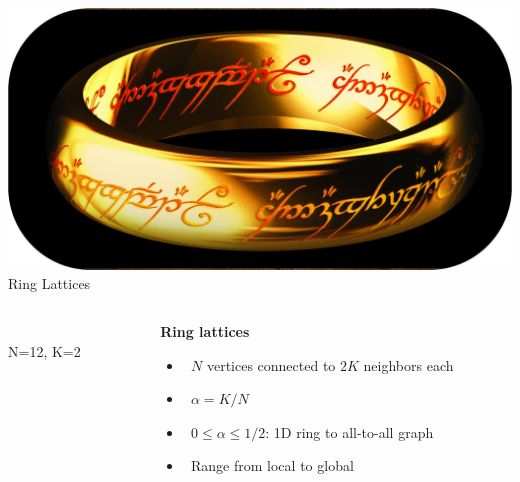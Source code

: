\documentclass[serif,mathserif]{beamer}
\begin{document}
\begin{frame}{\includegraphics[height=0.06\textheight]{ring-of-power.eps}\hspace{0.25cm} Ring Lattices}
    \begin{columns}
        \begin{column}{.5\textwidth}
            \\
            \vspace{0.1cm}
            N=12, K=2
        \end{column}
        \begin{column}{.5\textwidth}
            \textbf{Ring lattices}
            \begin{itemize}
                \vspace{0.25cm}
                \item \ \pause $N$ vertices connected to $2K$ neighbors each
                \vspace{0.25cm}
                \item \ \pause $\alpha = K/N$
                \vspace{0.25cm}
                \item \ \pause $0 \leq \alpha \leq 1/2$: 1D ring to all-to-all graph
                \vspace{0.25cm}
                \item \ \pause Range from local to global
            \end{itemize}
        \end{column}
    \end{columns}
\end{frame}
\end{document}
